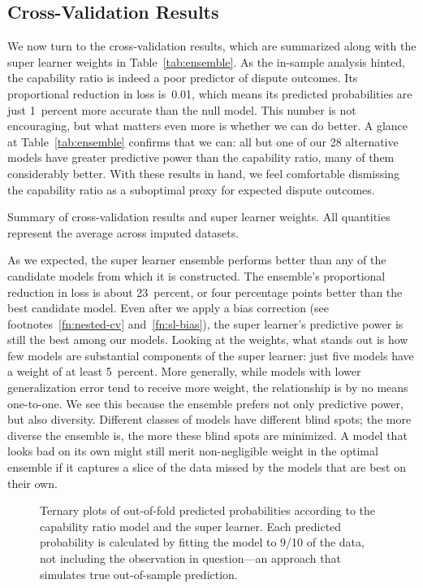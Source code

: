 \subsection{Cross-Validation Results}

We now turn to the cross-validation results, which are summarized along with the super learner weights in Table~\ref{tab:ensemble}.
As the in-sample analysis hinted, the capability ratio is indeed a poor predictor of dispute outcomes.
Its proportional reduction in loss is~0.01, which means its predicted probabilities are just 1~percent more accurate than the null model.
This number is not encouraging, but what matters even more is whether we can do better.
A glance at Table~\ref{tab:ensemble} confirms that we can: all but one of our 28 alternative models have greater predictive power than the capability ratio, many of them considerably better.
With these results in hand, we feel comfortable dismissing the capability ratio as a suboptimal proxy for expected dispute outcomes.

\begin{table}[tp]
  \centering
  
  \caption{
    Summary of cross-validation results and super learner weights.
    All quantities represent the average across imputed datasets.
  }
  \label{tab:ensemble}
\end{table}

As we expected, the super learner ensemble performs better than any of the candidate models from which it is constructed.
The ensemble's proportional reduction in loss is about 23~percent, or four percentage points better than the best candidate model.
Even after we apply a bias correction (see footnotes~\ref{fn:nested-cv} and~\ref{fn:sl-bias}), the super learner's predictive power is still the best among our models.
Looking at the weights, what stands out is how few models are substantial components of the super learner: just five models have a weight of at least 5~percent.
More generally, while models with lower generalization error tend to receive more weight, the relationship is by no means one-to-one.
We see this because the ensemble prefers not only predictive power, but also diversity.
Different classes of models have different blind spots; the more diverse the ensemble is, the more these blind spots are minimized.
A model that looks bad on its own might still merit non-negligible weight in the optimal ensemble if it captures a slice of the data missed by the models that are best on their own.

\begin{figure}[tp]
  \centering
  
  \vspace{-2em}
  \caption{
    Ternary plots of out-of-fold predicted probabilities according to the capability ratio model and the super learner.
    Each predicted probability is calculated by fitting the model to 9/10 of the data, not including the observation in question---an approach that simulates true out-of-sample prediction.
  }
  \label{fig:oof-pred}
\end{figure}

